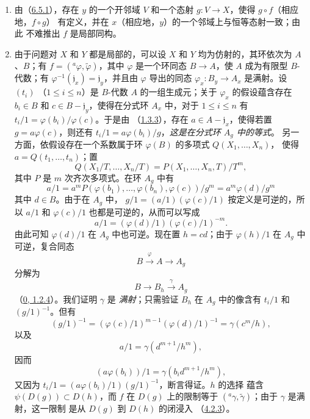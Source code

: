 \documentclass[UTF8,fontset=none,11pt,oneside,openany]{ctexbook}
\newcommand{\oldpage}[2][]{%
  \hypertarget{ega-source-page-#1-#2}{}%
  \marginnote{\scriptsize\textbf{#1}~|~#2}\ignorespaces}
\begin{document}
\begin{enumerate}
  \item[(ii)] 由（\hyperref[I.6.5.1-fr]{6.5.1}），存在 $y$ 的一个开邻域
    $V$ 和一个态射 $g:V\to X$，使得 $g\circ f$（相应地，$f\circ g$）
    有定义，并在 $x$（相应地，$y$）的一个邻域上与恒等态射一致；由此
    不难推出 $f$ 是局部同构。
  \item[(i)] 由于问题对 $X$ 和 $Y$ 都是局部的，可以设 $X$ 和 $Y$
    均为仿射的，其环依次为 $A$、$B$；有
    $f=({}^a\varphi,\widetilde{\varphi})$，其中 $\varphi$ 是一个环同态
    $B\to A$，使 $A$ 成为有限型 $B$-代数；有
    $\varphi^{-1}(\mathfrak{j}_x)=\mathfrak{j}_y$，并且由 $\varphi$
    导出的同态 $\varphi_x:B_y\to A_x$ 是满射。设 $(t_i)$
    （$1\leq i\leq n$）是 $B$-代数 $A$ 的一组生成元；关于
    $\varphi_x$ 的假设蕴含存在 $b_i\in B$ 和
    $c\in B-\mathfrak{j}_y$，使得在分式环 $A_x$ 中，对于
    $1\leq i\leq n$ 有 $t_i/1=\varphi(b_i)/\varphi(c)$。于是由
    （\hyperref[I.1.3.3-fr]{1.3.3}），存在
    $a\in A-\mathfrak{j}_x$，使得若置 $g=a\varphi(c)$，则还有
    $t_i/1=a\varphi(b_i)/g$，\emph{这是在分式环 $A_g$ 中的等式}。
    另一方面，依假设存在一个系数属于环 $\varphi(B)$ 的多项式
    $Q(X_1,\ldots,X_n)$，
\oldpage[I]{152}
    使得 $a=Q(t_1,\ldots,t_n)$；置
    \[
      Q(X_1/T,\ldots,X_n/T)
      =P(X_1,\ldots,X_n,T)/T^m,
    \]
    其中 $P$ 是 $m$ 次齐次多项式。在环 $A_g$ 中有
    \[
      a/1
      =a^mP(\varphi(b_1),\ldots,\varphi(b_n),\varphi(c))/g^m
      =a^m\varphi(d)/g^m
    \]
    其中 $d\in B$。由于在 $A_g$ 中，
    $g/1=(a/1)(\varphi(c)/1)$ 按定义是可逆的，所以 $a/1$ 和
    $\varphi(c)/1$ 也都是可逆的，从而可以写成
    \[
      a/1=(\varphi(d)/1)(\varphi(c)/1)^{-m}.
    \]
    由此可知 $\varphi(d)/1$ 在 $A_g$ 中也可逆。现在置 $h=cd$；由于
    $\varphi(h)/1$ 在 $A_g$ 中可逆，复合同态
    \[
      B\xrightarrow{\varphi}A\longrightarrow A_g
    \]
    分解为
    \[
      B\longrightarrow B_h\xrightarrow{\gamma}A_g
    \]
    （\hyperref[0.1.2.4-fr]{0, 1.2.4}）。我们证明 $\gamma$ 是
    \emph{满射}；只需验证 $B_h$ 在 $A_g$ 中的像含有 $t_i/1$ 和
    $(g/1)^{-1}$。但有
    \[
      (g/1)^{-1}
      =(\varphi(c)/1)^{m-1}(\varphi(d)/1)^{-1}
      =\gamma(c^m/h),
    \]
    以及
    \[
      a/1=\gamma(d^{m+1}/h^m),
    \]
    因而
    \[
      (a\varphi(b_i))/1=\gamma(b_i d^{m+1}/h^m),
    \]
    又因为 $t_i/1=(a\varphi(b_i)/1)(g/1)^{-1}$，断言得证。$h$ 的选择
    蕴含 $\psi(D(g))\subset D(h)$，而 $f$ 在 $D(g)$ 上的限制等于
    $({}^a\gamma,\widetilde{\gamma})$；由于 $\gamma$ 是满射，这一限制
    是从 $D(g)$ 到 $D(h)$ 的闭浸入
    （\hyperref[I.4.2.3-fr]{4.2.3}）。
\end{enumerate}
\end{document}
